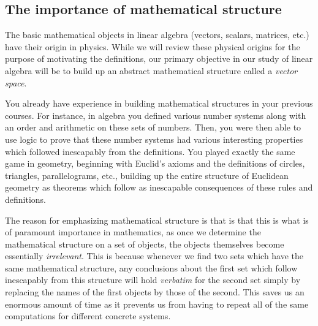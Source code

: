 \documentclass[12pt,letterpaper,reqno]{article}
\numberwithin{equation}{section}
\newcommand{\ti}[1]{\textit{#1}}
\begin{document}
\subsection{The importance of mathematical structure}
The basic mathematical objects in linear algebra (vectors, scalars, matrices, etc.) have their origin in physics. While we will review these physical origins for the purpose of motivating the definitions, our primary objective in our study of linear algebra will be to build up an abstract mathematical structure called a \ti{vector space}. 

You already have experience in building mathematical structures in your previous courses. For instance, in algebra you defined various number systems along with an order and arithmetic on these sets of numbers. Then, you were then able to use logic to prove that these number systems had various interesting properties which followed inescapably from the definitions. You played exactly the same game in geometry, beginning with Euclid's axioms and the definitions of circles, triangles, parallelograms, etc., building up the entire structure of Euclidean geometry as theorems which follow as inescapable consequences of these rules and definitions.

The reason for emphasizing mathematical structure is that is that this is what is of paramount importance in mathematics, as once we determine the mathematical structure on a set of objects, the objects themselves become essentially \ti{irrelevant}. This is because whenever we find two sets which have the same mathematical structure, any conclusions about the first set which follow inescapably from this structure will hold \ti{verbatim} for the second set simply by replacing the names of the first objects by those of the second. This saves us an enormous amount of time as it prevents us from having to repeat all of the same computations for different concrete systems. 
\end{document}

